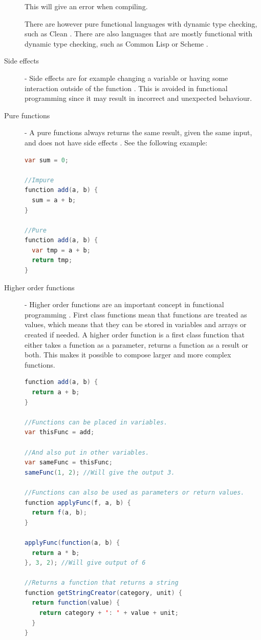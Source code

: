 \documentclass {article}
\begin{document}
\begin{description}
\item [ ] This will give an error when compiling.
\item[] There are however pure functional languages with dynamic type checking, such as Clean \cite{clean}. There are also languages that are mostly functional with dynamic type checking, such as Common Lisp \cite{commonLisp} or Scheme \cite{scheme} \cite{langTable}.
\item [Side effects] - Side effects are for example changing a variable or having some interaction outside of the function \cite{drboolean}. This is avoided in functional programming since it may result in incorrect and unexpected behaviour. 
\item [Pure functions] - A pure functions always returns the same result, given the same input, and does not have side effects \cite{drboolean}. See the following example: 

\begin{lstlisting}[language=Java]
var sum = 0;

//Impure
function add(a, b) {
  sum = a + b;
}

//Pure
function add(a, b) {
  var tmp = a + b;
  return tmp;
}
\end{lstlisting}

\item [Higher order functions] - Higher order functions are an important concept in functional programming \cite{fogus}. First class functions mean that functions are treated as values, which means that they can be stored in variables and arrays or created if needed. A higher order function is a first class function that either takes a function as a parameter, returns a function as a result or both. This makes it possible to compose larger and more complex functions.

\begin{lstlisting}[language=Java, breaklines=true]
function add(a, b) {
  return a + b;
}

//Functions can be placed in variables.
var thisFunc = add;

//And also put in other variables.
var sameFunc = thisFunc;
sameFunc(1, 2); //Will give the output 3.

//Functions can also be used as parameters or return values.
function applyFunc(f, a, b) {
  return f(a, b);
}

applyFunc(function(a, b) {
  return a * b;
}, 3, 2); //Will give output of 6

//Returns a function that returns a string
function getStringCreator(category, unit) {
  return function(value) {
    return category + ': ' + value + unit;
  }
}


\end{lstlisting}
\end{description}
\end{document}
